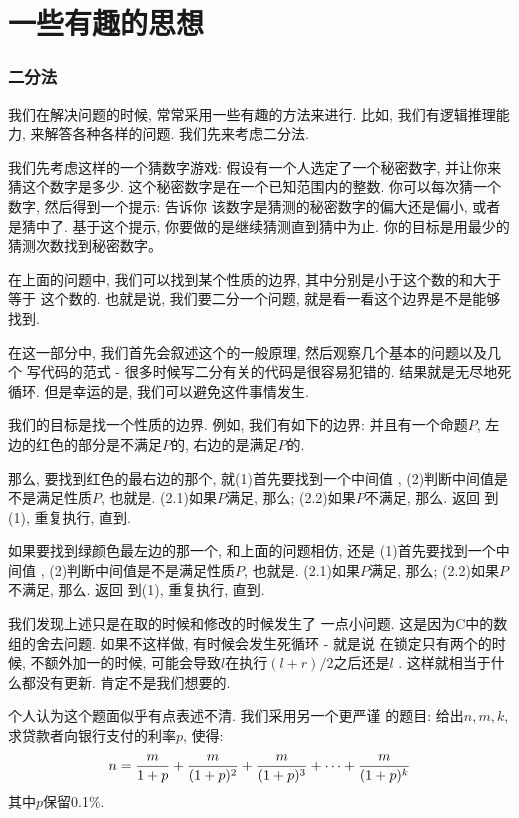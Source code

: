 \part{一些有趣的思想}

\section{二分法}

我们在解决问题的时候, 常常采用一些有趣的方法来进行. 比如, 我们有逻辑推理能力, 
来解答各种各样的问题. 我们先来考虑二分法. 

我们先考虑这样的一个猜数字游戏: 假设有一个人选定了一个秘密数字, 并让你来猜这个数字是多少.
这个秘密数字是在一个已知范围内的整数. 你可以每次猜一个数字, 然后得到一个提示: 告诉你
该数字是猜测的秘密数字的偏大还是偏小, 或者是猜中了. 
基于这个提示, 你要做的是继续猜测直到猜中为止. 你的目标是用最少的猜测次数找到秘密数字。

在上面的问题中, 我们可以找到某个性质的边界, 其中分别是小于这个数的和大于等于
这个数的. 也就是说, 我们要二分一个问题, 就是看一看这个边界是不是能够找到. 

在这一部分中, 我们首先会叙述这个的一般原理, 然后观察几个基本的问题以及几个
写代码的范式 - 很多时候写二分有关的代码是很容易犯错的. 结果就是无尽地死循环.
但是幸运的是, 我们可以避免这件事情发生. 


 我们的目标是找一个性质的边界. 例如, 我们有如下的边界: 
并且有一个命题$P$, 左边的红色的部分是不满足$P$的, 右边的是满足$P$的. 

那么, 要找到红色的最右边的那个, 就(1)首先要找到一个中间值
, (2)判断中间值是不是满足性质$P$, 也就是. (2.1)如果$P$满足, 
那么; (2.2)如果$P$不满足, 那么. 返回
到(1), 重复执行, 直到. 

如果要找到绿颜色最左边的那一个, 和上面的问题相仿, 还是
(1)首先要找到一个中间值
, (2)判断中间值是不是满足性质$P$, 也就是. (2.1)如果$P$满足, 
那么; (2.2)如果$P$不满足, 那么. 返回
到(1), 重复执行, 直到. 

我们发现上述只是在取的时候和修改的时候发生了
一点小问题. 这是因为C中的数组的舍去问题. 如果不这样做, 有时候会发生死循环 - 就是说
在锁定只有两个的时候, 不额外加一的时候, 可能会导致$l$在执行$(l+r)/2$之后还是$l$
. 这样就相当于什么都没有更新. 肯定不是我们想要的. 


 个人认为这个题面似乎有点表述不清. 我们采用另一个更严谨
的题目: 给出$n,m,k$, 求贷款者向银行支付的利率$p$, 使得: 
$$
n={m\over 1+p} +{m\over (1+p)^2}+{m\over (1+p)^3}+\cdots + {m\over (1+p)^k} 
$$
其中$p$保留0.1\%.  

